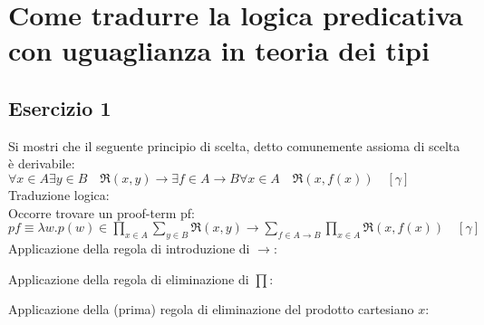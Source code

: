 \newpage
\section{Come tradurre la logica predicativa con uguaglianza in teoria dei tipi}

\subsection{Esercizio 1}

Si mostri che il seguente principio di scelta, detto comunemente assioma di scelta è derivabile: \\

$\forall x \in A \exists y \in B \quad \Re (x, y) \rightarrow \exists f \in A \rightarrow B \forall x \in A \quad \Re (x, f(x)) \quad [\gamma]$ \\

Traduzione logica: \\

Occorre trovare un proof-term pf: \\

$pf \equiv \lambda w. p(w) \in \prod_{x \in A} \sum_{y \in B} \Re (x, y) \rightarrow \sum_{f \in A \rightarrow B} \prod_{x \in A} \Re (x, f(x)) \quad [\gamma]$ \\

Applicazione della regola di introduzione di $\rightarrow$:

\begin{prooftree}
\end{prooftree}

Applicazione della regola di eliminazione di $\prod$:

\begin{prooftree}
\end{prooftree}

Applicazione della (prima) regola di eliminazione del prodotto cartesiano $x$:

\begin{prooftree}
\end{prooftree}

